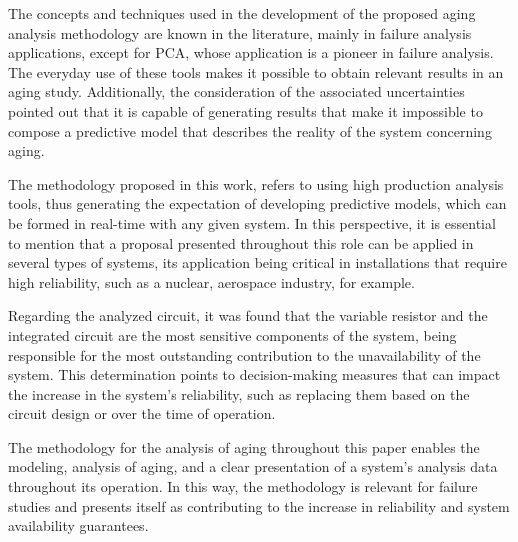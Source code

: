 \documentclass{ws-m3as}
\begin{document}
The concepts and techniques used in the development of the proposed aging analysis methodology are known in the literature, mainly in failure analysis applications, except for PCA, whose application is a pioneer in failure analysis. The everyday use of these tools makes it possible to obtain relevant results in an aging study. Additionally, the consideration of the associated uncertainties pointed out that it is capable of generating results that make it impossible to compose a predictive model that describes the reality of the system concerning aging.

The methodology proposed in this work, refers to using high production analysis tools, thus generating the expectation of developing predictive models, which can be formed in real-time with any given system. In this perspective, it is essential to mention that a proposal presented throughout this role can be applied in several types of systems, its application being critical in installations that require high reliability, such as a nuclear, aerospace industry, for example.

Regarding the analyzed circuit, it was found that the variable resistor and the integrated circuit are the most sensitive components of the system, being responsible for the most outstanding contribution to the unavailability of the system. This determination points to decision-making measures that can impact the increase in the system's reliability, such as replacing them based on the circuit design or over the time of operation.

The methodology for the analysis of aging throughout this paper enables the modeling, analysis of aging, and a clear presentation of a system's analysis data throughout its operation. In this way, the methodology is relevant for failure studies and presents itself as contributing to the increase in reliability and system availability guarantees.
\end{document}
